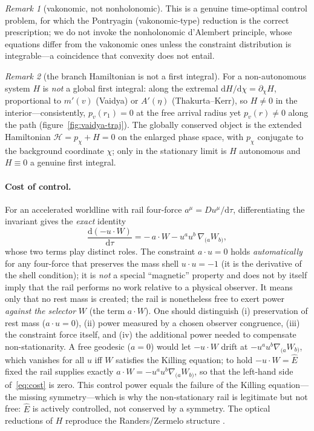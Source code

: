 \documentclass[12pt]{iopart}
\newcommand{\Ehat}{\hat E}
\newcommand{\dd}{\mathrm{d}}
\theoremstyle{plain}
\theoremstyle{definition}
\theoremstyle{plain}
\theoremstyle{remark}
\newtheorem*{remark}{Remark}
\begin{document}
\begin{remark}[vakonomic, not nonholonomic]
This is a genuine time-optimal control problem, for which the Pontryagin
(vakonomic-type) reduction is the correct prescription; we do not invoke the nonholonomic
d'Alembert principle, whose equations differ from the vakonomic ones unless the constraint
distribution is integrable---a coincidence that convexity does not entail.
\end{remark}

\begin{remark}[the branch Hamiltonian is not a first integral]
For a non-autonomous system $H$ is \emph{not} a global first integral: along the
extremal $\dd H/\dd\chi=\partial_\chi H$, proportional to $m'(v)$ (Vaidya) or $A'(\eta)$
(Thakurta--Kerr), so $H\neq0$ in the interior---consistently, $p_v(r_1)=0$ at the
free arrival radius yet $p_v(r)\neq0$ along the path (figure~\ref{fig:vaidya-traj}).
The globally conserved object is the extended Hamiltonian $\mathcal H=p_\chi+H=0$ on
the enlarged phase space, with $p_\chi$ conjugate to the background coordinate $\chi$; only
in the stationary limit is $H$ autonomous and $H\equiv0$ a genuine first integral.
\end{remark}

\paragraph{Cost of control.} For an accelerated worldline with rail four-force
$a^\mu=Du^\mu/\dd\tau$, differentiating the invariant gives the \emph{exact}
identity
\begin{equation}
    \frac{\dd(-u\cdot W)}{\dd\tau}=-\,a\cdot W-u^a u^b\,\nabla_{(a}W_{b)},
    \label{eq:cost}
\end{equation}
whose two terms play distinct roles. The constraint $a\cdot u=0$ holds
\emph{automatically} for any four-force that preserves the mass shell
$u\cdot u=-1$ (it is the derivative of the shell condition); it is \emph{not} a
special ``magnetic'' property and does not by itself imply that the rail performs no
work relative to a physical observer. It means only that no rest mass is created;
the rail is nonetheless free to exert power \emph{against the selector} $W$ (the term
$a\cdot W$). One should distinguish (i) preservation of rest mass ($a\cdot u=0$),
(ii) power measured by a chosen observer congruence, (iii) the constraint force
itself, and (iv) the additional power needed to compensate non-stationarity.
A free geodesic ($a=0$) would let $-u\cdot W$ drift at $-u^au^b\nabla_{(a}W_{b)}$,
which vanishes for all $u$ iff $W$ satisfies the Killing equation; to hold
$-u\cdot W=\Ehat$ fixed the rail supplies exactly $a\cdot W=-u^au^b\nabla_{(a}W_{b)}$,
so that the left-hand side of~\eqref{eq:cost} is zero. This control power equals the
failure of the Killing equation---the missing symmetry---which is why the
non-stationary rail is legitimate but not free: $\Ehat$ is actively controlled, not
conserved by a symmetry. The optical reductions of $H$
reproduce the Randers/Zermelo structure
\cite{GibbonsRanders2009,CaponioWind}.
\end{document}
